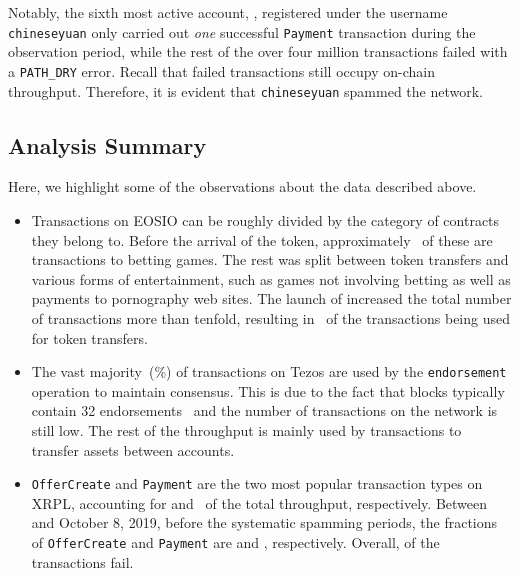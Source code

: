 Notably, the sixth most active account, , registered under the username \texttt{chineseyuan} only carried out \textit{one} successful \texttt{Payment} transaction during the observation period, while the rest of the over four million transactions failed with a \texttt{PATH\_DRY} error. Recall that failed transactions still occupy on-chain throughput. Therefore, it is evident that \texttt{chineseyuan} spammed the network.



\subsection{Analysis Summary}
Here, we highlight some of the observations about the data described above. 
\begin{itemize}\itemsep=0pt
    \item Transactions on EOSIO can be roughly divided by the category of contracts they belong to. 
    Before the arrival of the  token, approximately~ of these are transactions to betting games. The rest was split between token transfers and various forms of entertainment, such as games not involving betting as well as payments to pornography web sites. The launch of  increased the total number of transactions more than tenfold, resulting in~ of the transactions being used for token transfers.
    
    \item The vast majority~(\%) of transactions on Tezos are used by the \texttt{endorsement} operation to maintain consensus. This is due to the fact that blocks typically contain 32 endorsements~\cite{Tezos2018} and the number of transactions on the network is still low. The rest of the throughput is mainly used by transactions to transfer assets between accounts.
    
    \item \texttt{OfferCreate} and \texttt{Payment} are the two most popular transaction types on XRPL, accounting for  and~ of the total throughput, respectively. Between \startdate and October 8, 2019, before the systematic spamming periods, the fractions of \texttt{OfferCreate} and \texttt{Payment} are  and , respectively. Overall,  of the transactions fail.
\end{itemize}
